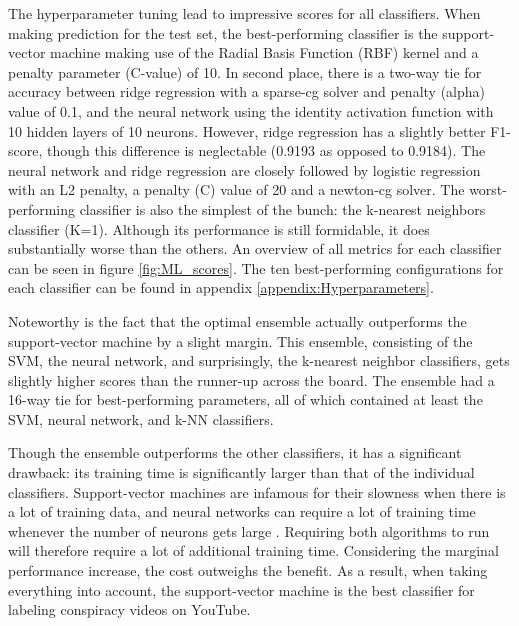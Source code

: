 \documentclass[../main.tex]{subfiles}
\begin{document}
The hyperparameter tuning lead to impressive scores for all classifiers. When making prediction for the
test set, the best-performing classifier is the support-vector machine making use of the Radial Basis
Function (RBF) kernel and a penalty parameter (C-value) of 10. In second place, there is a two-way tie
for accuracy between ridge regression with a sparse-cg solver and penalty (alpha) value of 0.1, and the
neural network using the identity activation function with 10 hidden layers of 10 neurons. However,
ridge regression has a slightly better F1-score, though this difference is neglectable (0.9193 as
opposed to 0.9184). The neural network and ridge regression are closely followed by logistic regression
with an L2 penalty, a penalty (C) value of 20 and a newton-cg solver. The worst-performing classifier is
also the simplest of the bunch: the k-nearest neighbors classifier (K=1). Although its performance is
still formidable, it does substantially worse than the others. An overview of all metrics for each
classifier can be seen in figure \ref{fig:ML_scores}. The ten best-performing configurations for each
classifier can be found in appendix \ref{appendix:Hyperparameters}.

Noteworthy is the fact that the optimal ensemble actually outperforms the support-vector machine by a
slight margin. This ensemble, consisting of the SVM, the neural network, and surprisingly, the k-nearest
neighbor classifiers, gets slightly higher scores than the runner-up across the board. The ensemble had
a 16-way tie for best-performing parameters, all of which contained at least the SVM, neural network,
and k-NN classifiers. 

Though the ensemble outperforms the other classifiers, it has a significant drawback: its training time
is significantly larger than that of the individual classifiers. Support-vector machines are infamous
for their slowness when there is a lot of training data, and neural networks can require a lot of
training time whenever the number of neurons gets large \citep{burges1997improving,
kamarthi1999accelerating}. Requiring both algorithms to run will therefore require a lot of additional
training time. Considering the marginal performance increase, the cost outweighs the benefit. As a
result, when taking everything into account, the support-vector machine is the best classifier for
labeling conspiracy videos on YouTube.  
\end{document}
